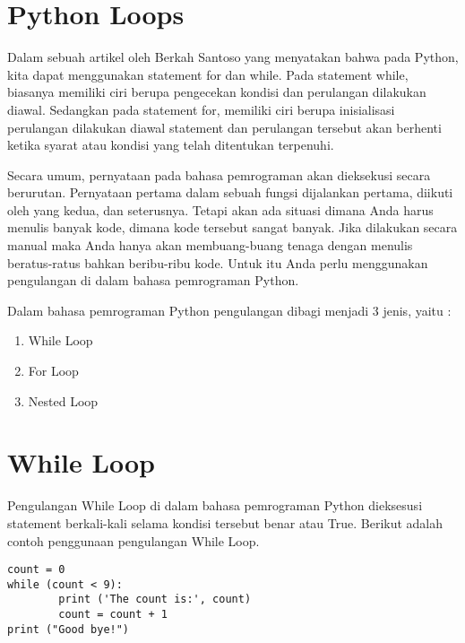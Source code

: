 
\section {Python Loops}

Dalam sebuah artikel oleh Berkah Santoso yang menyatakan bahwa pada Python, kita dapat menggunakan statement for dan while. Pada statement while,  biasanya memiliki ciri berupa pengecekan kondisi dan perulangan dilakukan diawal. Sedangkan pada statement for, memiliki ciri berupa inisialisasi perulangan dilakukan diawal statement dan perulangan tersebut akan berhenti ketika syarat atau kondisi yang telah ditentukan terpenuhi. \cite{santoso2009bahasa}

Secara umum, pernyataan pada bahasa pemrograman akan dieksekusi secara berurutan. Pernyataan pertama dalam sebuah fungsi dijalankan pertama, diikuti oleh yang kedua, dan seterusnya. Tetapi akan ada situasi dimana Anda harus menulis banyak kode, dimana kode tersebut sangat banyak. Jika dilakukan secara manual maka Anda hanya akan membuang-buang tenaga dengan menulis beratus-ratus bahkan beribu-ribu kode. Untuk itu Anda perlu menggunakan pengulangan di dalam bahasa pemrograman Python. 
 


Dalam bahasa pemrograman Python pengulangan dibagi menjadi 3 jenis, yaitu : 
\begin{enumerate}
\item
While Loop 
\item
For Loop 
\item
Nested Loop 
\end{enumerate}




\section {While Loop} 
Pengulangan While Loop di dalam bahasa pemrograman Python dieksesusi statement berkali-kali selama kondisi tersebut benar atau True. 
Berikut adalah contoh penggunaan pengulangan While Loop.
 

\begin {verbatim}
count = 0 
while (count < 9): 
        print ('The count is:', count) 
        count = count + 1 
print ("Good bye!") 
\end{verbatim} 




 
